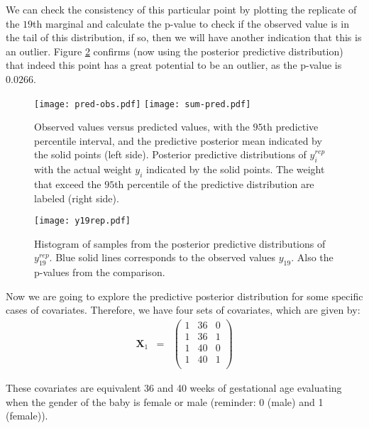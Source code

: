 \documentclass[a4paper, 11pt]{article}
\begin{document}
We can check the consistency of this particular point by plotting the replicate of the $19$th marginal and calculate the p-value to check if the observed value is in the tail of this distribution, if so, then we will have another indication that this is an outlier. Figure \ref{y19pred} confirms (now using the posterior predictive distribution) that indeed this point has a great potential to be an outlier, as the p-value is $0.0266$.

\begin{figure}[H]
\centering
\texttt{[image: pred-obs.pdf]}  
\texttt{[image: sum-pred.pdf]}  
\caption{Observed values versus predicted values, with the $95$th predictive percentile interval, and the predictive posterior mean indicated by the solid points (left side). Posterior predictive distributions of $y_i^{rep}$ with the actual weight $y_i$ indicated by the solid points. The weight that exceed the $95$th percentile of the predictive distribution are labeled (right side).}
\label{Pred}
\end{figure}

\begin{figure}[H]
\centering
\texttt{[image: y19rep.pdf]}    
\caption{Histogram of samples from the posterior predictive distributions of $y_{19}^{rep}$. Blue solid lines corresponds to the observed values $y_{19}$. Also the p-values from the comparison.}
\label{y19pred}
\end{figure}

Now we are going to explore the predictive posterior distribution for some specific cases of covariates. Therefore, we have four sets of covariates, which are given by:
\begin{equation*}
\begin{array}{lclll}
\textbf{X}_1 & = &  \left(
    \begin{array}{cccc}
     1 & 36 & 0 \\
     1 & 36 & 1 \\
     1 & 40 & 0 \\
     1 & 40 & 1 \\
    \end{array}
        \right)
\end{array}
\end{equation*}

These covariates are equivalent 36 and 40 weeks of gestational age evaluating when the gender of the baby is female or male (reminder: 0 (male) and 1 (female)).
\end{document}
